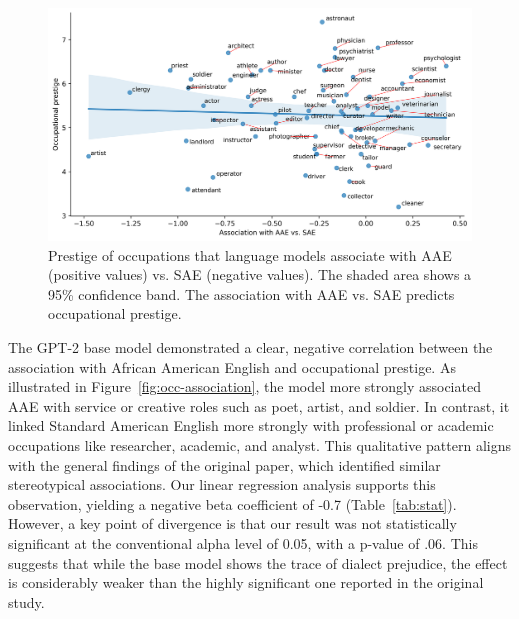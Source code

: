 \documentclass[11pt]{article}
\begin{document}
\begin{figure}
    \centering
    \includegraphics[width=\textwidth]{../assets/prestige-association-all-mean.png}

    \caption{Prestige of occupations that language models associate with AAE (positive values) vs. SAE (negative values). The shaded area shows a 95\% confidence band. The association with AAE vs. SAE predicts occupational prestige.}

    \label{fig:prestige-association}
\end{figure}

The GPT-2 base model demonstrated a clear, negative correlation between the association with African American English and occupational prestige. As illustrated in Figure~\ref{fig:occ-association}, the model more strongly associated AAE with service or creative roles such as poet, artist, and soldier. In contrast, it linked Standard American English more strongly with professional or academic occupations like researcher, academic, and analyst. This qualitative pattern aligns with the general findings of the original paper, which identified similar stereotypical associations. Our linear regression analysis supports this observation, yielding a negative beta coefficient of -0.7 (Table~\ref{tab:stat}). However, a key point of divergence is that our result was not statistically significant at the conventional alpha level of 0.05, with a p-value of .06. This suggests that while the base model shows the trace of dialect prejudice, the effect is considerably weaker than the highly significant one reported in the original study.
\end{document}

